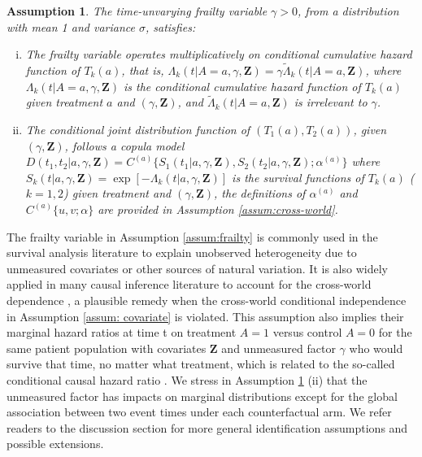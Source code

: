 \documentclass[12pt]{article}
\theoremstyle{plain}
\newtheorem{assum}{Assumption}
\def\red #1{{\color{red}{#1}}}
\def\bfZ{\mathbf{Z}}
\def\Pr{\operatorname{Pr}}
\begin{document}
\begin{assum}
The time-unvarying frailty variable $\gamma>0$, from a distribution with mean 1 and variance $\sigma$, satisfies:
\begin{enumerate}[(i)]
\item The frailty variable operates multiplicatively on conditional cumulative hazard function of $T_k(a)$, that is, $\Lambda_k(t|A=a,\gamma,\bfZ) = \gamma\widetilde{\Lambda}_k(t|A=a,\bfZ)$,
where $\Lambda_k(t|A=a,\gamma,\bfZ) $ is the conditional cumulative hazard function of $T_k(a)$ given treatment $a$ and $(\gamma,\bfZ)$, and $\widetilde{\Lambda}_k(t|A=a,\bfZ)$ is irrelevant to $\gamma$.
\item The conditional joint distribution function of $(T_1(a),T_2(a))$, given $(\gamma,\bfZ)$, follows a copula model 
$D(t_1,t_2|a,\gamma,\bfZ) 
= C^{(a)}\{S_1(t_1|a,\gamma,\bfZ),S_2(t_2|a,\gamma,\bfZ);\alpha^{(a)}\}$ %
where $S_k(t|a,\gamma,\bfZ)=\exp[-\Lambda_k(t|a,\gamma,\bfZ)]$ is the survival functions of $T_k(a)$ ($k=1,2$) given treatment and $(\gamma,\bfZ)$, the definitions of $\alpha^{(a)}$ and $C^{(a)}\{u,v;\alpha\}$ are provided in Assumption \ref{assum:cross-world}.
\end{enumerate}
\label{assum:cross-world_frailty}
\end{assum}

The frailty variable in Assumption \ref{assum:frailty} is commonly used in the survival analysis literature to explain unobserved heterogeneity due to unmeasured covariates or other sources of natural variation.  It is also widely applied in many causal inference literature to account for the cross-world dependence \citep{aalen2015does,martinussen2020subtleties,axelrod2022sensitivity}, a plausible remedy when the cross-world conditional independence in Assumption \ref{assum: covariate} is violated. 
This assumption also implies their marginal hazard ratios at time t on treatment $A=1$ versus control $A=0$ for the same patient population with covariates $\bfZ$ and unmeasured factor $\gamma$ who would survive that time, no matter what treatment, which is related to the so-called conditional causal hazard ratio \citep{martinussen2020subtleties}.
We stress in Assumption \ref{assum:cross-world_frailty} (ii) that the unmeasured factor has impacts on marginal distributions except for the global association between two event times under each counterfactual arm. We refer readers to the discussion section for more general identification assumptions and possible extensions.
\end{document}
